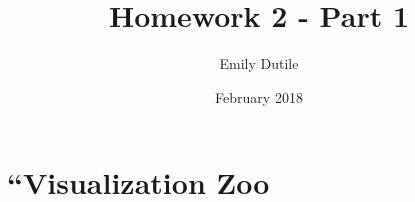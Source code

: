 \documentclass{neu_handout}
\title{Homework 2 - Part 1}
\author{Emily Dutile}
\date{February 2018}
\begin{document}
\section*{“Visualization Zoo}
\end{document}
